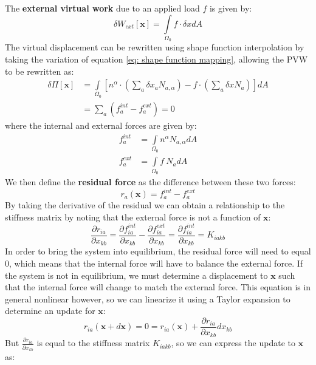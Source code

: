 \documentclass[]{spie}  %
\begin{document}
The \textbf{external virtual work} due to an applied load $f$ is given by:
\begin{equation}
\label{eq: external virtual work}
\delta W_{ext}[\bm{x}] = \int\limits_{\Omega_0} f \cdot \delta x dA
\end{equation}
The virtual displacement can be rewritten using shape function interpolation by taking the variation of equation \ref{eq: shape function mapping}, allowing the PVW to be rewritten as:
\begin{align}
\delta\Pi[\bm{x}] &= \int\limits_{\Omega_0} \left[ n^\alpha \cdot \left( \sum\limits_{a} \delta x_a N_{a,\alpha} \right) - f \cdot \left( \sum\limits_{a} \delta x N_a \right) \right] dA \\
			&= \sum\limits_{a} \left( f_a^{int} - f_a^{ext} \right) = 0
\end{align}
where the internal and external forces are given by:
\begin{align}
f_a^{int} &= \int\limits_{\Omega_0} n^\alpha N_{a,\alpha} dA \\
f_a^{ext} &= \int\limits_{\Omega_0} f \ N_a dA
\end{align}
We then define the \textbf{residual force} as the difference between these two forces:
\begin{equation}
\label{eq: residual force}
r_a(\bm{x}) = f_a^{int} - f_a^{ext}
\end{equation}
By taking the derivative of the residual we can obtain a relationship to the stiffness matrix by noting that the external force is not a function of $\bm{x}$:
\begin{equation}
\frac{\partial r_{ia}}{\partial x_{kb}} = \frac{\partial f^{int}_{ia}}{\partial x_{kb}} - \frac{\partial f^{ext}_{ia}}{\partial x_{kb}} = \frac{\partial f^{int}_{ia}}{\partial x_{kb}} = K_{iakb} 
\end{equation}
In order to bring the system into equilibrium, the residual force will need to equal 0, which means that the internal force will have to balance the external force. If the system is not in equilibrium, we must determine a displacement to $\bm{x}$ such that the internal force will change to match the external force. This equation is in general nonlinear however, so we can linearize it using a Taylor expansion to determine an update for $\bm{x}$:
\begin{equation}
r_{ia}(\bm{x} + d\bm{x}) = 0 = r_{ia}(\bm{x}) + \frac{\partial r_{ia}}{\partial x_{kb}} dx_{kb}
\end{equation}
But $\frac{\partial r_{ia}}{\partial x_{kb}}$ is equal to the stiffness matrix $K_{iakb}$, so we can express the update to $\bm{x}$ as:
\end{document}
